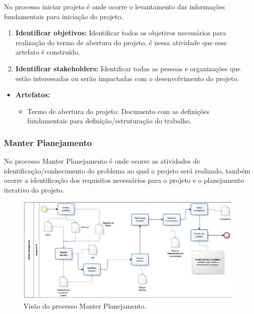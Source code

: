 No processo iniciar projeto é onde ocorre o levantamento das informações fundamentais para iniciação do projeto. 

\begin{enumerate}
	\item \textbf{Identificar objetivos:} 
		Identificar todos os objetivos necessários para realização do termo de abertura do projeto, é nessa atividade que esse artefato é construído.
	\item \textbf{Identificar stakeholders:}
		Identificar todas as pessoas e organizações que estão interessadas ou serão impactadas com o desenvolvimento do projeto. 
\end{enumerate}

\begin{itemize}
	\item {\bf Artefatos:}
		\begin{itemize}
		\item Termo de abertura do projeto: Documento com as definições fundamentais para definição/estruturação do trabalho. 
		\end{itemize}
\end{itemize}

\subsubsection{Manter Planejamento}

No processo Manter Planejamento é onde ocorre as atividades de identificação/conhecimento do problema ao qual o projeto será realizado, também ocorre a identificação dos requisitos necessários para o projeto e o planejamento iterativo do projeto. 

\begin{landscape}
\begin{figure}[H]
	\centering
	\label{Visão do processo Manter Planejamento}
		\includegraphics[keepaspectratio=true,scale=0.9,angle=360]{processo/manterPlanejamento.png}
	\caption{Visão do processo Manter Planejamento.}
\end{figure}
\end{landscape}

